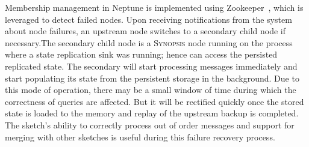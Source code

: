Membership management in Neptune is implemented using Zookeeper~\cite{hunt2010zookeeper}, which is leveraged to detect failed nodes.
Upon receiving notifications from the system about node failures, an upstream node switches to a secondary child node if necessary.The secondary child node is a \textsc{Synopsis} node running on the process where a state replication sink was running; hence can access the persisted replicated state.
The secondary will start processing messages immediately and start populating its state from the persistent storage in the background.
Due to this mode of operation, there may be a small window of time during which the correctness of queries are affected.
But it will be rectified quickly once the stored state is loaded to the memory and replay of the upstream backup is completed.
The sketch's ability to correctly process out of order messages and support for merging with other sketches is useful during this failure recovery process.

